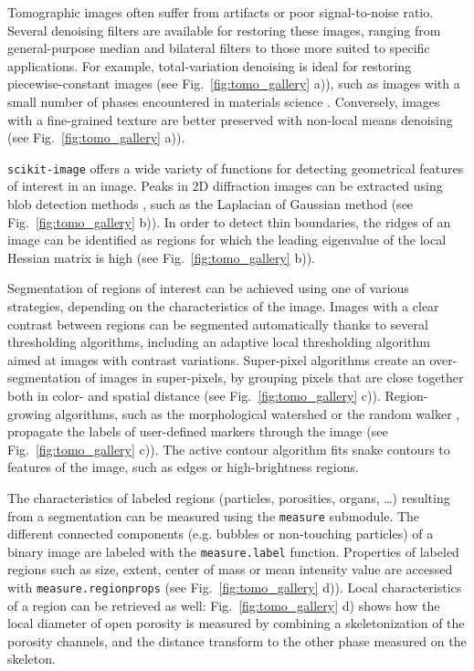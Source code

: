 \documentclass[twocolumn]{bmcart}%
\begin{document}
Tomographic images often suffer from artifacts or poor signal-to-noise
ratio. Several denoising filters are available for restoring these
images, ranging from general-purpose median and bilateral
filters to those more suited to specific applications. For example, total-variation denoising \citep{Chambolle2004,
Getreuer2012} is ideal for restoring piecewise-constant images (see
Fig.~\ref{fig:tomo_gallery} a)), such as images with a small number of
phases encountered in materials science \citep{Bouttes2015}. Conversely,
images with a fine-grained texture are better preserved with non-local
means denoising \citep{Buades2005} (see Fig.~\ref{fig:tomo_gallery} a)).

\texttt{scikit-image} offers a wide variety of functions for detecting
geometrical features of interest in an image. Peaks in 2D
diffraction images can be extracted using blob detection methods
\citep{Ashiotis2015}, such as the Laplacian of Gaussian method (see
Fig.~\ref{fig:tomo_gallery} b)). In order to detect thin boundaries, the
ridges of an image can be identified as regions for which the leading eigenvalue
of the local Hessian matrix is high (see Fig.~\ref{fig:tomo_gallery} b)).

Segmentation of regions of interest can be achieved using one of various
strategies, depending on the characteristics of the image. Images with a
clear contrast between regions can be segmented automatically thanks to
several thresholding algorithms, including an adaptive local thresholding
algorithm aimed at images with contrast variations. Super-pixel
algorithms \citep{Felzenszwalb2004, Achanta2012} create an
over-segmentation of images in super-pixels, by grouping pixels that are
close together both in color- and spatial distance (see
Fig.~\ref{fig:tomo_gallery} c)). Region-growing algorithms, such as the
morphological watershed or the random walker \citep{Grady2006}, propagate
the labels of user-defined markers through the image (see
Fig.~\ref{fig:tomo_gallery} c)). The active contour algorithm
\citep{Kass1988} fits snake contours to features of the image, such as
edges or high-brightness regions.

The characteristics of labeled regions (particles, porosities, organs,
\dots) resulting from a segmentation can be measured using the
\texttt{measure} submodule. The different connected components (e.g.
bubbles or non-touching particles) of a binary image are labeled with the
\texttt{measure.label} function. Properties of labeled regions such as
size, extent, center of mass or mean intensity value are accessed with
\texttt{measure.regionprops} (see Fig.~\ref{fig:tomo_gallery} d)). Local
characteristics of a region can be retrieved as well:
Fig.~\ref{fig:tomo_gallery} d) shows how the local diameter of open
porosity is measured by combining a skeletonization of the porosity
channels, and the distance transform to the other phase measured on the
skeleton.   
\end{document}
